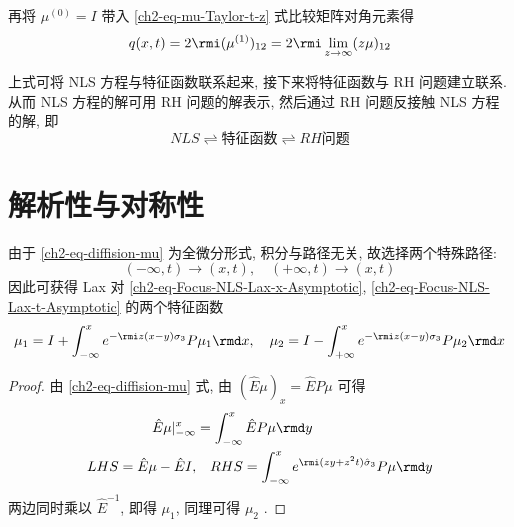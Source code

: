 再将 $ \mu^{(0)} = I $ 带入 \eqref{ch2-eq-mu-Taylor-t-z} 式比较矩阵对角元素得
\begin{equation}
    q(x,t) = 2 \rmi (\mu^{(1)})_{12} = 2 \rmi \lim_{z \to \infty} (z\mu)_{12}
\end{equation}
\begin{remark}
    上式可将 NLS 方程与特征函数联系起来, 接下来将特征函数与 RH 问题建立联系. 从而 NLS 方程的解可用 RH 问题的解表示, 然后通过 RH 问题反接触 NLS 方程的解, 即
    \begin{equation*}
        NLS \rightleftharpoons \text{特征函数} \rightleftharpoons RH \text{问题}
    \end{equation*}
\end{remark}

\section{解析性与对称性}\label{ch2-sec-analytic-symmetry}
由于 \eqref{ch2-eq-diffision-mu} 为全微分形式, 积分与路径无关, 故选择两个特殊路径:
\begin{equation*}
    (- \infty, t) \to(x,t) , \quad (+ \infty, t) \to(x,t)
\end{equation*}
因此可获得 Lax 对 \eqref{ch2-eq-Focus-NLS-Lax-x-Asymptotic}, \eqref{ch2-eq-Focus-NLS-Lax-t-Asymptotic} 的两个特征函数
\begin{equation}
    \mu_{1} = I + \int^{x}_{-\infty} e^{- \rmi z (x - y) \sigma_{3}} P \mu_{1}\rmd x, \quad \mu_{2} = I - \int^{x}_{+\infty} e^{- \rmi z (x - y) \sigma_{3}} P \mu_{2}\rmd x \label{ch2-eq-integral-mu}
\end{equation}
\begin{proof}
    由 \eqref{ch2-eq-diffision-mu} 式, 由 $ (\hat{E} \mu)_{x} = \hat{E} P \mu $ 可得
    \begin{subequations}
        \begin{align}
            \hat{E} \mu |_{-\infty}^{x}     & = \int_{-\infty}^{x} \hat{E} P \mu \rmd y                                           \\
            LHS = \hat{E} \mu - \hat{E} I , & \quad RHS = \int_{-\infty}^{x} e^{ \rmi (zy + z^2 t )\hat{\sigma}_{3}} P \mu \rmd y
        \end{align}
    \end{subequations}
    两边同时乘以 $ \hat{E}^{-1} $, 即得 $ \mu_{1} $, 同理可得 $ \mu_{2} $ .
\end{proof}


